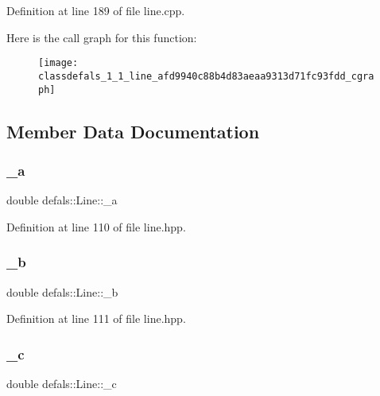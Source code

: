 Definition at line 189 of file line.\+cpp.

Here is the call graph for this function\+:\nopagebreak
\begin{figure}[H]
\begin{center}
\leavevmode
\texttt{[image: classdefals\_1\_1\_line\_afd9940c88b4d83aeaa9313d71fc93fdd\_cgraph]}
\end{center}
\end{figure}


\subsection{Member Data Documentation}
\mbox{\label{classdefals_1_1_line_a49d1d66185aa34cb7d16886d77fe8af1}} 
\subsubsection{\texorpdfstring{\+\_\+a}{\_a}}
{\footnotesize\ttfamily double defals\+::\+Line\+::\+\_\+a\hspace{0.3cm}{\ttfamily [private]}}



Definition at line 110 of file line.\+hpp.

\mbox{\label{classdefals_1_1_line_a499efa9575dbc3c187835b26759750b9}} 
\subsubsection{\texorpdfstring{\+\_\+b}{\_b}}
{\footnotesize\ttfamily double defals\+::\+Line\+::\+\_\+b\hspace{0.3cm}{\ttfamily [private]}}



Definition at line 111 of file line.\+hpp.

\mbox{\label{classdefals_1_1_line_ae7a6360dde2b061056d03a4aec9c9855}} 
\subsubsection{\texorpdfstring{\+\_\+c}{\_c}}
{\footnotesize\ttfamily double defals\+::\+Line\+::\+\_\+c\hspace{0.3cm}{\ttfamily [private]}}



